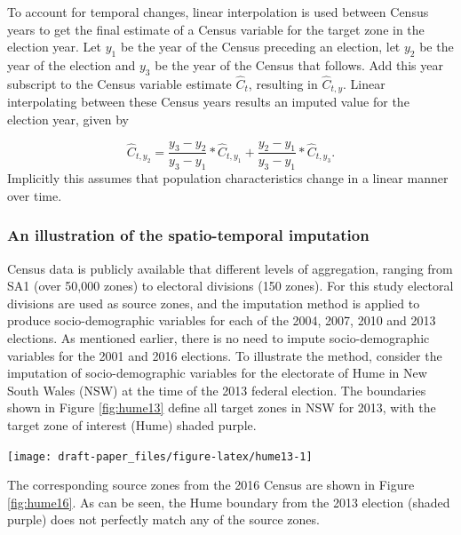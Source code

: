 \documentclass[11pt,a4paper,]{article}
\let\origfigure\figure
\let\endorigfigure\endfigure
\renewenvironment{figure}[1][2] {
    \expandafter\origfigure\expandafter[H]
} {
    \endorigfigure
}
\begin{document}
To account for temporal changes, linear interpolation is used between Census years to get the final estimate of a Census variable for the target zone in the election year. Let \(y_1\) be the year of the Census preceding an election, let \(y_2\) be the year of the election and \(y_3\) be the year of the Census that follows. Add this year subscript to the Census variable estimate \(\hat{C}_t\), resulting in \(\hat{C}_{t,y}\). Linear interpolating between these Census years results an imputed value for the election year, given by

\[\hat{C}_{t,y_2} = \frac{y_3-y_2}{y_3-y_1}*\hat{C}_{t,y_1} + \frac{y_2-y_1}{y_3-y_1}*\hat{C}_{t,y_3}.\]
Implicitly this assumes that population characteristics change in a linear manner over time.

\hypertarget{an-illustration-of-the-spatio-temporal-imputation}{%
\subsubsection{An illustration of the spatio-temporal imputation}\label{an-illustration-of-the-spatio-temporal-imputation}}

Census data is publicly available that different levels of aggregation, ranging from SA1 (over 50,000 zones) to electoral divisions (150 zones). For this study electoral divisions are used as source zones, and the imputation method is applied to produce socio-demographic variables for each of the 2004, 2007, 2010 and 2013 elections. As mentioned earlier, there is no need to impute socio-demographic variables for the 2001 and 2016 elections. To illustrate the method, consider the imputation of socio-demographic variables for the electorate of Hume in New South Wales (NSW) at the time of the 2013 federal election. The boundaries shown in Figure \ref{fig:hume13} define all target zones in NSW for 2013, with the target zone of interest (Hume) shaded purple.

\begin{figure}[h]

{\centering \texttt{[image: draft-paper\_files/figure-latex/hume13-1]} 

}

\caption{Some of the electoral boundaries in NSW for 2013, with the electoral boundary for Hume shown in purple.}\label{fig:hume13}
\end{figure}

The corresponding source zones from the 2016 Census are shown in Figure \ref{fig:hume16}. As can be seen, the Hume boundary from the 2013 election (shaded purple) does not perfectly match any of the source zones.
\end{document}

